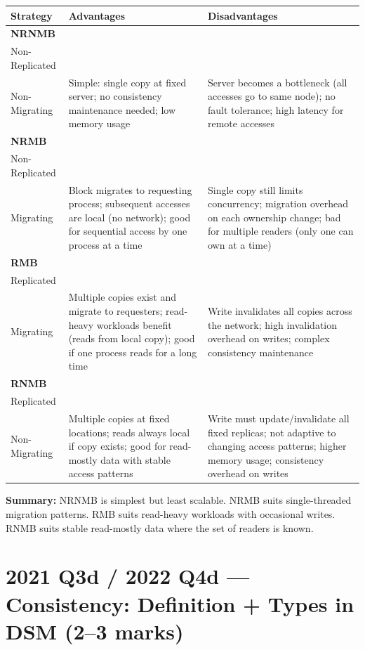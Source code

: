 \documentclass[12pt,a4paper]{article}
\begin{document}
\begin{center}
\begin{tabular}{@{}p{2.8cm}p{5.8cm}p{5.8cm}@{}}
\toprule
Strategy & Advantages & Disadvantages \\
\midrule
\textbf{NRNMB}\\Non-Replicated\\Non-Migrating & Simple: single copy at fixed server; no consistency maintenance needed; low memory usage & Server becomes a bottleneck (all accesses go to same node); no fault tolerance; high latency for remote accesses \\
\addlinespace
\textbf{NRMB}\\Non-Replicated\\Migrating & Block migrates to requesting process; subsequent accesses are local (no network); good for sequential access by one process at a time & Single copy still limits concurrency; migration overhead on each ownership change; bad for multiple readers (only one can own at a time) \\
\addlinespace
\textbf{RMB}\\Replicated\\Migrating & Multiple copies exist and migrate to requesters; read-heavy workloads benefit (reads from local copy); good if one process reads for a long time & Write invalidates all copies across the network; high invalidation overhead on writes; complex consistency maintenance \\
\addlinespace
\textbf{RNMB}\\Replicated\\Non-Migrating & Multiple copies at fixed locations; reads always local if copy exists; good for read-mostly data with stable access patterns & Write must update/invalidate all fixed replicas; not adaptive to changing access patterns; higher memory usage; consistency overhead on writes \\
\bottomrule
\end{tabular}
\end{center}

\textbf{Summary:} NRNMB is simplest but least scalable. NRMB suits single-threaded migration patterns. RMB suits read-heavy workloads with occasional writes. RNMB suits stable read-mostly data where the set of readers is known.

\section{2021 Q3d / 2022 Q4d --- Consistency: Definition + Types in DSM (2--3 marks)}
\end{document}
